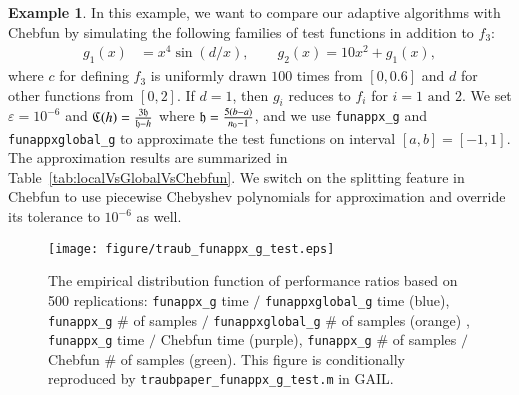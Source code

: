 \documentclass[review]{elsarticle}
\newcommand{\abstol}{\varepsilon}
\theoremstyle{definition}
\newtheorem{exmp}{Example}
\newcommand{\funappxg}{\texttt{funappx\_g}\xspace}
\newcommand{\funappxglobalg}{\texttt{funappxglobal\_g\xspace}}
\begin{document}
\begin{exmp}
In this example, we want to compare our adaptive algorithms with Chebfun by
simulating the following families of test functions in addition to $f_3$:
%
\begin{align*}
 g_1(x) &= x^4 \sin(d/x), \qquad
 g_2(x) = 10  x^2 + g_1(x),
\end{align*}
where $c$ for defining $f_3$ is uniformly drawn $100$ times from $[0,0.6]$ and
$d$ for other functions from $[0,2]$. If $d=1$, then  $g_i$ reduces to $f_i$ for
$i=1 \mbox{ and } 2$.
We set $\abstol = 10^{-6}$ and $\mathfrak{C}
(h) = \frac{ 3 \mathfrak{h}}{\mathfrak{h}-h}$ where $\mathfrak{h} = \frac{5(b-a)}{n_0-1}$, and we use
\texttt{funappx\_g} and \texttt{funappxglobal\_g} to approximate the test
functions on interval $[a,b]=[-1,1]$. The approximation results are
summarized in Table~\ref{tab:localVsGlobalVsChebfun}. We switch on the splitting
feature in Chebfun to use piecewise Chebyshev polynomials for approximation and override its tolerance to $10^{-6}$ as well.

%
\begin{figure}[th]
  \centering
\texttt{[image: figure/traub\_funappx\_g\_test.eps]}
\caption{The empirical distribution function of performance ratios based on 500 replications:  \funappxg{} time $/$ \funappxglobalg{} time (blue), \funappxg{} \# of samples $/$ \funappxglobalg{} \# of samples (orange) ,   \funappxg{} time $/$ Chebfun time (purple), \funappxg{} \# of samples $/$ Chebfun \# of samples (green). This figure is conditionally reproduced by
\texttt{traubpaper\_funappx\_g\_test.m} in GAIL.}
  \label{fig:testfunctions}
\end{figure}


\end{exmp}
\end{document}
